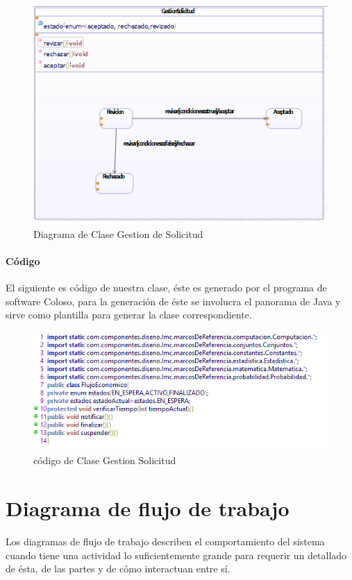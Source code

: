 \begin{figure}[H]
	\centering
	\includegraphics[width=0.8\linewidth]{parte2/imgs/DiagramaDeEstado/claseEstados}
	\caption{Diagrama de Clase Gestion de Solicitud}
	\label{fig:diagramaEstadoClase}
\end{figure}

\paragraph{Código}

El siguiente es código de nuestra clase, éste es generado por el programa de software Coloso, para la generación de éste se involucra el panorama de Java y sirve como plantilla para generar la clase correspondiente.

\begin{figure}[H]
	\centering
	\includegraphics[width=1\linewidth]{parte2/imgs/DiagramaDeEstado/codigo}
	\caption{código de Clase Gestion Solicitud}
	\label{fig:diagramaEstadoClaseCodigo}
\end{figure}\newpage

\section{Diagrama de flujo de trabajo}
Los diagramas de flujo de trabajo describen el comportamiento del sistema cuando tiene una actividad lo suficientemente grande para requerir un detallado de ésta, de las partes y de cómo interactuan entre sí.

